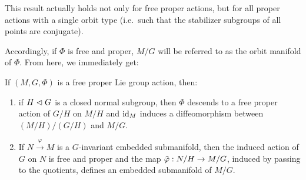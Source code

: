 \begin{rem}
    This result actually holds not only for free proper actions, but for all proper actions with a single orbit type (i.e.\ such that the stabilizer subgroups of all points are conjugate).
\end{rem}


Accordingly, if $\Phi$ is free and proper, $M\slash G$ will be referred to as the orbit manifold of $\Phi$. From here, we immediately get:

\begin{cor}[{{\cite[Cor.~6.5.3]{RS1}}}]\label{cor 6.5.3 RS1}
    If $(M,G,\Phi)$ is a free proper Lie group action, then:
    \begin{enumerate}
        \item if $H\vartriangleleft G$ is a closed normal subgroup, then $\Phi$ descends to a free proper action of $G\slash H$ on $M\slash H$ and $\operatorname{id}_M$ induces a diffeomorphism between $(M\slash H)\slash (G\slash H)$ and $M\slash G$.
        \item If $N\overset{\varphi}{\to}M$ is a $G$-invariant embedded submanifold, then the induced action of $G$ on $N$ is free and proper and the map $\wh{\varphi}:N\slash H\to M\slash G$, induced by passing to the quotients, defines an embedded submanifold of $M\slash G$.
    \end{enumerate}
\end{cor}


